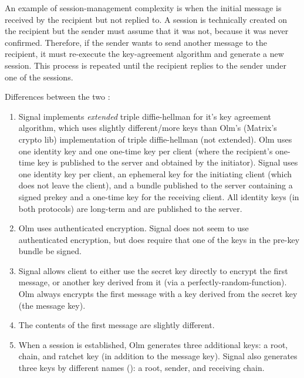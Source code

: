 An example
of session-management complexity is when the initial message is received by the
recipient but not replied to. A session is technically created on the recipient
but the sender must assume that it was not, because it was never confirmed. 
Therefore, if the sender wants to send another message to the recipient, it must
re-execute the key-agreement algorithm and generate a new session. This process
is repeated until the recipient replies to the sender under one of the sessions.

Differences between the two :
\begin{enumerate}
\item Signal implements \textit{extended} triple diffie-hellman for it's key agreement
algorithm, which uses slightly different/more keys than Olm's (Matrix's crypto 
lib) implementation of triple diffie-hellman (not extended).
Olm uses one identity key 
and one one-time key per client (where the recipient's 
one-time key is published to the server and obtained by the
initiator). Signal uses one identity key per client, an 
ephemeral key for the initiating client (which does not leave
the client), and a bundle published to the server containing
a signed prekey and a one-time key for the receiving client.
All identity keys (in both protocols) are long-term and are published to the server.
\item Olm uses authenticated encryption. Signal does not seem to use authenticated 
encryption, but does require that one of the keys in the pre-key bundle be 
signed. 
\item Signal allows client to either use the secret
key directly to encrypt the first message, or another key
derived from it (via a perfectly-random-function). Olm always encrypts the first
message with a key derived from the secret key (the message key).
\item The contents of the first message are slightly different.
\item When a session is established, Olm generates three additional keys: a root, 
chain, and ratchet key (in addition to the message key). Signal also generates
three keys by different names (): a root, 
sender, and receiving chain.
\end{enumerate}

